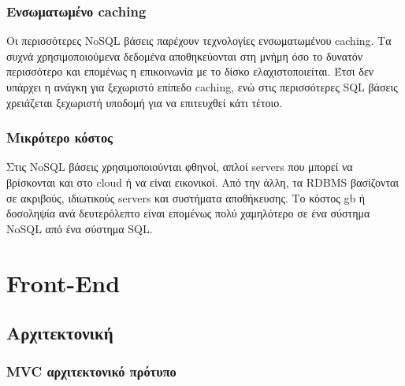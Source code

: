 		\subsubsection{Ενσωματωμένο caching}
		Οι περισσότερες NoSQL βάσεις παρέχουν τεχνολογίες ενσωματωμένου caching. Τα συχνά χρησιμοποιούμενα δεδομένα αποθηκεύονται στη μνήμη όσο το δυνατόν περισσότερο και επομένως η επικοινωνία με το δίσκο ελαχιστοποιείται. Έτσι δεν υπάρχει η ανάγκη για ξεχωριστό επίπεδο caching, ενώ στις περισσότερες SQL βάσεις χρειάζεται ξεχωριστή υποδομή για να επιτευχθεί κάτι τέτοιο\cite{stonebraker2010sql}.
		
		\subsubsection{Μικρότερο κόστος}
		Στις NoSQL βάσεις χρησιμοποιούνται φθηνοί, απλοί servers που μπορεί να βρίσκονται και στο cloud ή να είναι εικονικοί. Από την άλλη, τα RDBMS βασίζονται σε ακριβούς, ιδιωτικούς servers και συστήματα αποθήκευσης. Το κόστος gb ή δοσοληψία ανά δευτερόλεπτο είναι επομένως πολύ χαμηλότερο σε ένα σύστημα NoSQL από ένα σύστημα SQL\cite{stonebraker2010sql}.
\section{Front-End}
	\subsection{Αρχιτεκτονική}
		\subsubsection{MVC αρχιτεκτονικό πρότυπο}\label{sssection:mvc}

